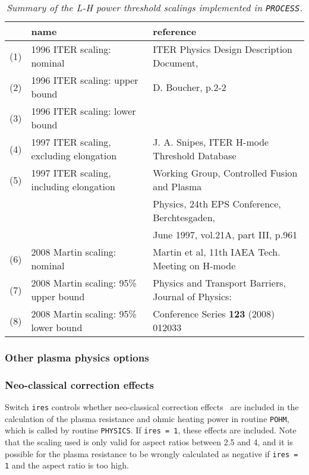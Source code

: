 \documentclass[11pt,a4paper]{report}
\newcommand{\process}{\mbox{\texttt{PROCESS}}}
\begin{document}

\begin{table}[tbph]
\small
\begin{center}
\begin{tabular}{||c||l||l||} \hline
 & name & reference \\ \hline
(1) & 1996 ITER scaling: nominal & ITER Physics Design Description Document, \\
(2) & 1996 ITER scaling: upper bound & D. Boucher, p.2-2 \\
(3) & 1996 ITER scaling: lower bound &  \\ \hline
(4) & 1997 ITER scaling, excluding elongation & J. A. Snipes, ITER H-mode
Threshold Database \\
(5) & 1997 ITER scaling, including elongation &  Working Group, Controlled
Fusion and Plasma \\
 & & Physics, 24th EPS Conference, Berchtesgaden, \\
 & & June 1997, vol.21A, part III, p.961 \\ \hline
(6) & 2008 Martin scaling: nominal & Martin et al, 11th IAEA Tech. Meeting on
H-mode \\
(7) & 2008 Martin scaling: 95\% upper bound &  Physics and Transport Barriers,
Journal of Physics: \\
(8) & 2008 Martin scaling: 95\% lower bound & Conference Series \textbf{123}
(2008) 012033 \\
\hline
\end{tabular}
\end{center}
\normalsize
\caption[List of available L-H power threshold scalings]
{\label{tab:power_thresholds}
  \textit{Summary of the L-H power threshold scalings implemented in \process.}
}
\end{table}

\subsubsection{Other plasma physics options}

\subsubsection*{Neo-classical correction effects}

Switch \texttt{ires} controls whether neo-classical correction
effects~\cite{Uckan} are included in the calculation of the plasma resistance
and ohmic heating power in routine \texttt{POHM}, which is called by routine
\texttt{PHYSICS}. If \texttt{ires = 1}, these effects are included. Note that
the scaling used is only valid for aspect ratios between 2.5 and 4, and it is
possible for the plasma resistance to be wrongly calculated as negative if
\texttt{ires = 1} and the aspect ratio is too high.
\end{document}
